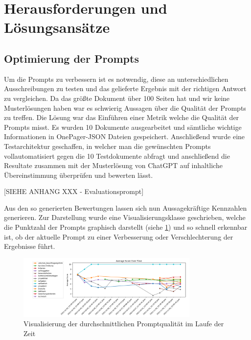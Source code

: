 \section{Herausforderungen und Lösungsansätze}

\subsection{Optimierung der Prompts}
Um die Prompts zu verbessern ist es notwendig, diese an unterschiedlichen Ausschreibungen zu testen und das gelieferte 
Ergebnis mit der richtigen Antwort zu vergleichen. Da das größte Dokument über 100 Seiten hat und wir keine Musterlösungen 
haben war es schwierig Aussagen über die Qualität der Prompts zu treffen. Die Lösung war das Einführen einer Metrik welche 
die Qualität der Prompts misst. Es wurden 10 Dokumente ausgearbeitet und sämtliche wichtige Informationen in OnePager-JSON Dateien 
gespeichert. Anschließend wurde eine Testarchitektur geschaffen, in welcher man die gewünschten Prompts vollautomatisiert 
gegen die 10 Testdokumente abfragt und anschließend die Resultate zusammen mit der Musterlösung von ChatGPT auf inhaltliche 
Übereinstimmung überprüfen und bewerten lässt.

[SIEHE ANHANG XXX - Evaluationsprompt]

Aus den so generierten Bewertungen lassen sich nun Aussagekräftige Kennzahlen 
generieren. Zur Darstellung wurde eine Visualisierungsklasse geschrieben, welche die Punktzahl der Prompts graphisch darstellt 
(siehe \ref{fig:03_Prompt_Evaluierung}) und so schnell erkennbar ist, ob der aktuelle Prompt zu einer Verbesserung 
oder Verschlechterung der Ergebnisse führt.

\begin{figure}[H]
    \centering
    \includegraphics[width=0.8\textwidth]{figures/03_Prompt_Evaluierung.png}
    \caption{Visualisierung der durchschnittlichen Promptqualität im Laufe der Zeit}
    \label{fig:03_Prompt_Evaluierung}    %
\end{figure}

